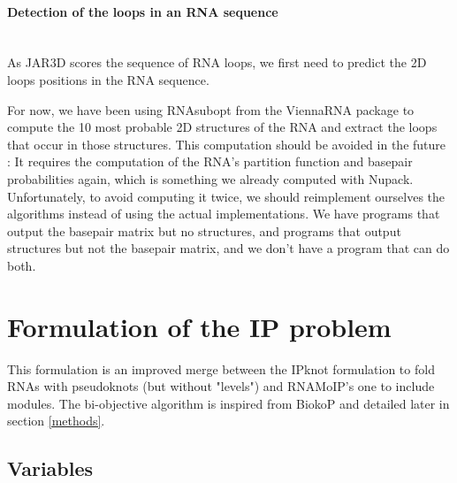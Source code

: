 \documentclass{article}
\begin{document}
\paragraph{\textbf{Detection of the loops in an RNA sequence}} ~ \\
As JAR3D scores the sequence of RNA loops, we first need to predict the 2D loops positions in the RNA sequence.

For now, we have been using RNAsubopt from the ViennaRNA package \cite{lorenz_viennarna_2011} to compute the 10 most probable 2D structures of the RNA and extract the loops that occur in those structures.
This computation should be avoided in the future : It requires the computation of the RNA's partition function and basepair probabilities again, which is something we already computed with Nupack.
Unfortunately, to avoid computing it twice, we should reimplement ourselves the algorithms instead of using the actual implementations. We have programs that output the basepair matrix but no structures, and programs that output structures but not the basepair matrix, and we don't have a program that can do both.

\section{Formulation of the IP problem}
	
This formulation is an improved merge between the IPknot \cite{sato_ipknot:_2011} formulation to fold RNAs with pseudoknots (but without "levels") and RNAMoIP's one \cite{reinharz_towards_2012} to include modules.
The bi-objective algorithm is inspired from BiokoP \cite{legendre_bi-objective_2018} and detailed later in section \ref{methods}.
	
	
\subsection{Variables} 
	
\end{document}
